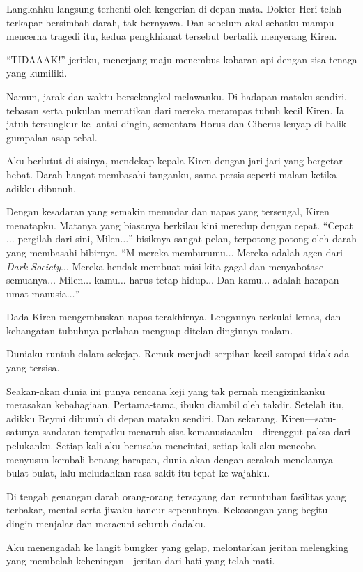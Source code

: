 Langkahku langsung terhenti oleh kengerian di depan mata. Dokter Heri telah terkapar bersimbah darah, tak bernyawa. Dan sebelum akal sehatku mampu mencerna tragedi itu, kedua pengkhianat tersebut berbalik menyerang Kiren.

``TIDAAAK!'' jeritku, menerjang maju menembus kobaran api dengan sisa tenaga yang kumiliki.

Namun, jarak dan waktu bersekongkol melawanku. Di hadapan mataku sendiri, tebasan serta pukulan mematikan dari mereka merampas tubuh kecil Kiren. Ia jatuh tersungkur ke lantai dingin, sementara Horus dan Ciberus lenyap di balik gumpalan asap tebal.

Aku berlutut di sisinya, mendekap kepala Kiren dengan jari-jari yang bergetar hebat. Darah hangat membasahi tanganku, sama persis seperti malam ketika adikku dibunuh.

Dengan kesadaran yang semakin memudar dan napas yang tersengal, Kiren menatapku. Matanya yang biasanya berkilau kini meredup dengan cepat. ``Cepat$\dots$ pergilah dari sini, Milen$\dots$'' bisiknya sangat pelan, terpotong-potong oleh darah yang membasahi bibirnya. ``M-mereka memburumu$\dots$ Mereka adalah agen dari \textit{Dark Society}$\dots$ Mereka hendak membuat misi kita gagal dan menyabotase semuanya$\dots$ Milen$\dots$ kamu$\dots$ harus tetap hidup$\dots$ Dan kamu$\dots$ adalah harapan umat manusia$\dots$''

Dada Kiren mengembuskan napas terakhirnya. Lengannya terkulai lemas, dan kehangatan tubuhnya perlahan menguap ditelan dinginnya malam.

Duniaku runtuh dalam sekejap. Remuk menjadi serpihan kecil sampai tidak ada yang tersisa.

Seakan-akan dunia ini punya rencana keji yang tak pernah mengizinkanku merasakan kebahagiaan. Pertama-tama, ibuku diambil oleh takdir. Setelah itu, adikku Reymi dibunuh di depan mataku sendiri. Dan sekarang, Kiren—satu-satunya sandaran tempatku menaruh sisa kemanusiaanku—direnggut paksa dari pelukanku. Setiap kali aku berusaha mencintai, setiap kali aku mencoba menyusun kembali benang harapan, dunia akan dengan serakah menelannya bulat-bulat, lalu meludahkan rasa sakit itu tepat ke wajahku.

Di tengah genangan darah orang-orang tersayang dan reruntuhan fasilitas yang terbakar, mental serta jiwaku hancur sepenuhnya. Kekosongan yang begitu dingin menjalar dan meracuni seluruh dadaku.

Aku menengadah ke langit bungker yang gelap, melontarkan jeritan melengking yang membelah keheningan—jeritan dari hati yang telah mati.

